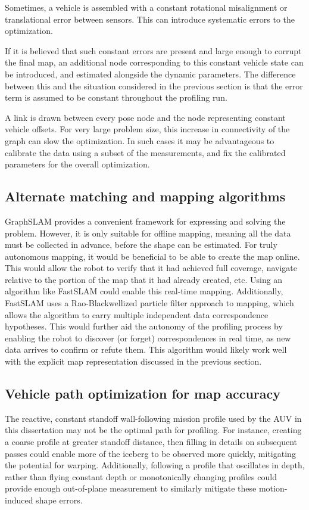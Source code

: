 Sometimes, a vehicle is assembled with a constant rotational misalignment or translational error between sensors. This can introduce systematic errors to the optimization.

If it is believed that such constant errors are present and large enough to corrupt the final map, an additional node corresponding to this constant vehicle state can be introduced, and estimated alongside the dynamic parameters. The difference between this and the situation considered in the previous section is that the error term is assumed to be constant throughout the profiling run. 

A link is drawn between every pose node and the node representing constant vehicle offsets. For very large problem size, this increase in connectivity of the graph can slow the optimization. In such cases it may be advantageous to calibrate the data using a subset of the measurements, and fix the calibrated parameters for the overall optimization. 




\subsection{Alternate matching and mapping algorithms}

GraphSLAM provides a convenient framework for expressing and solving the problem. However, it is only suitable for offline mapping, meaning all the data must be collected in advance, before the shape can be estimated. For truly autonomous mapping, it would be beneficial to be able to create the map online. This would allow the robot to verify that it had achieved full coverage, navigate relative to the portion of the map that it had already created, etc. Using an algorithm like FastSLAM \cite{Montemerlo2002} could enable this real-time mapping. Additionally, FastSLAM uses a Rao-Blackwellized particle filter approach to mapping, which allows the algorithm to carry multiple independent data correspondence hypotheses. This would further aid the autonomy of the profiling process by enabling the robot to discover (or forget) correspondences in real time, as new data arrives to confirm or refute them. This algorithm would likely work well with the explicit map representation discussed in the previous section.

\subsection{Vehicle path optimization for map accuracy}
The reactive, constant standoff wall-following mission profile used by the AUV in this dissertation may not be the optimal path for profiling. For instance, creating a coarse profile at greater standoff distance, then filling in details on subsequent passes could enable more of the iceberg to be observed more quickly, mitigating the potential for warping. Additionally, following a profile that oscillates in depth, rather than flying constant depth or monotonically changing profiles could provide enough out-of-plane measurement to similarly mitigate these motion-induced shape errors. 


